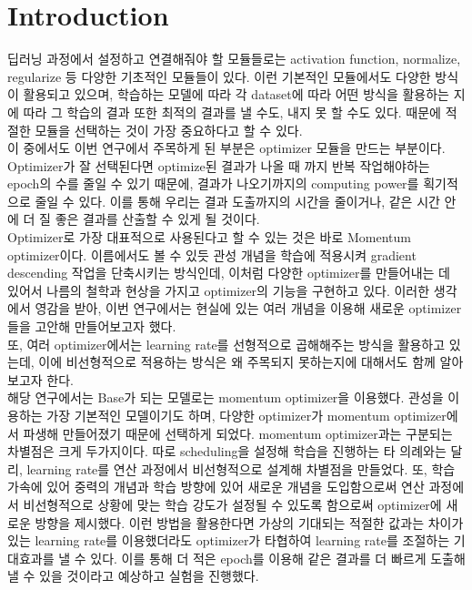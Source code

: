 \documentclass{article}
\begin{document}
\section{Introduction}
딥러닝 과정에서 설정하고 연결해줘야 할 모듈들로는 activation function, normalize, regularize 등 다양한 기초적인 모듈들이 있다. 이런 기본적인 모듈에서도 다양한 방식이 활용되고 있으며, 학습하는 모델에 따라 각 dataset에 따라 어떤 방식을 활용하는 지에 따라 그 학습의 결과 또한 최적의 결과를 낼 수도, 내지 못 할 수도 있다. 때문에 적절한 모듈을 선택하는 것이 가장 중요하다고 할 수 있다.\\
이 중에서도 이번 연구에서 주목하게 된 부분은 optimizer 모듈을 만드는 부분이다. Optimizer가 잘 선택된다면 optimize된 결과가 나올 때 까지 반복 작업해야하는 epoch의 수를 줄일 수 있기 때문에, 결과가 나오기까지의 computing power를 획기적으로 줄일 수 있다. 이를 통해 우리는 결과 도출까지의 시간을 줄이거나, 같은 시간 안에 더 질 좋은 결과를 산출할 수 있게 될 것이다.\\
Optimizer로 가장 대표적으로 사용된다고 할 수 있는 것은 바로 Momentum optimizer이다. 이름에서도 볼 수 있듯 관성 개념을 학습에 적용시켜 gradient descending 작업을 단축시키는 방식인데, 이처럼 다양한 optimizer를 만들어내는 데 있어서 나름의 철학과 현상을 가지고 optimizer의 기능을 구현하고 있다. 이러한 생각에서 영감을 받아, 이번 연구에서는 현실에 있는 여러 개념을 이용해 새로운 optimizer들을 고안해 만들어보고자 했다.\\
또, 여러 optimizer에서는 learning rate를 선형적으로 곱해해주는 방식을 활용하고 있는데, 이에 비선형적으로 적용하는 방식은 왜 주목되지 못하는지에 대해서도 함께 알아보고자 한다.\\
해당 연구에서는 Base가 되는 모델로는 momentum optimizer을 이용했다. 관성을 이용하는 가장 기본적인 모델이기도 하며, 다양한 optimizer가 momentum optimizer에서 파생해 만들어졌기 때문에 선택하게 되었다. momentum optimizer과는 구분되는 차별점은 크게 두가지이다. 따로 scheduling을 설정해 학습을 진행하는 타 의례와는 달리, learning rate를 연산 과정에서 비선형적으로 설계해 차별점을 만들었다. 또, 학습 가속에 있어 중력의 개념과 학습 방향에 있어 새로운 개념을 도입함으로써 연산 과정에서 비선형적으로 상황에 맞는 학습 강도가 설정될 수 있도록 함으로써 optimizer에 새로운 방향을 제시했다. 이런 방법을 활용한다면 가상의 기대되는 적절한 값과는 차이가 있는 learning rate를 이용했더라도 optimizer가 타협하여 learning rate를 조절하는 기대효과를 낼 수 있다. 이를 통해 더 적은 epoch를 이용해 같은 결과를 더 빠르게 도출해낼 수 있을 것이라고 예상하고 실험을 진행했다.\\
\end{document}
